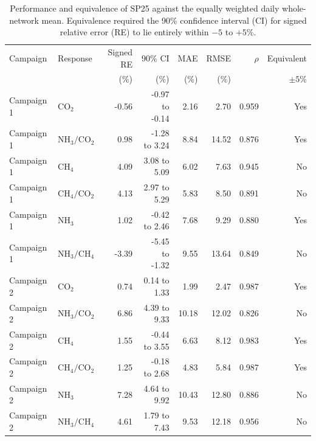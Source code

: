 \begin{table}[htbp]
\centering
\scriptsize
\caption{Performance and equivalence of SP25 against the equally weighted daily whole-network mean. Equivalence required the 90\% confidence interval (CI) for signed relative error (RE) to lie entirely within $-5$ to $+5$\%.}
\label{tab:sp25_equivalence}
\begin{tabular}{llrrrrrr}
\toprule
Campaign & Response & Signed RE & 90\% CI & MAE & RMSE & $\rho$ & Equivalent\\
& & (\%) & (\%) & (\%) & (\%) & & $\pm5$\%\\
\midrule
Campaign 1 & $\mathrm{CO_2}$ & -0.56 & -0.97 to -0.14 & 2.16 & 2.70 & 0.959 & Yes
\\
Campaign 1 & $\mathrm{NH_3}/\mathrm{CO_2}$ & 0.98 & -1.28 to 3.24 & 8.84 & 14.52 & 0.876 & Yes
\\
Campaign 1 & $\mathrm{CH_4}$ & 4.09 & 3.08 to 5.09 & 6.02 & 7.63 & 0.945 & No
\\
Campaign 1 & $\mathrm{CH_4}/\mathrm{CO_2}$ & 4.13 & 2.97 to 5.29 & 5.83 & 8.50 & 0.891 & No
\\
Campaign 1 & $\mathrm{NH_3}$ & 1.02 & -0.42 to 2.46 & 7.68 & 9.29 & 0.880 & Yes
\\
Campaign 1 & $\mathrm{NH_3}/\mathrm{CH_4}$ & -3.39 & -5.45 to -1.32 & 9.55 & 13.64 & 0.849 & No
\\
\midrule
Campaign 2 & $\mathrm{CO_2}$ & 0.74 & 0.14 to 1.33 & 1.99 & 2.47 & 0.987 & Yes
\\
Campaign 2 & $\mathrm{NH_3}/\mathrm{CO_2}$ & 6.86 & 4.39 to 9.33 & 10.18 & 12.02 & 0.826 & No
\\
Campaign 2 & $\mathrm{CH_4}$ & 1.55 & -0.44 to 3.55 & 6.63 & 8.12 & 0.983 & Yes
\\
Campaign 2 & $\mathrm{CH_4}/\mathrm{CO_2}$ & 1.25 & -0.18 to 2.68 & 4.83 & 5.84 & 0.987 & Yes
\\
Campaign 2 & $\mathrm{NH_3}$ & 7.28 & 4.64 to 9.92 & 10.43 & 12.80 & 0.886 & No
\\
Campaign 2 & $\mathrm{NH_3}/\mathrm{CH_4}$ & 4.61 & 1.79 to 7.43 & 9.53 & 12.18 & 0.956 & No
\\
\bottomrule
\end{tabular}
\end{table}
